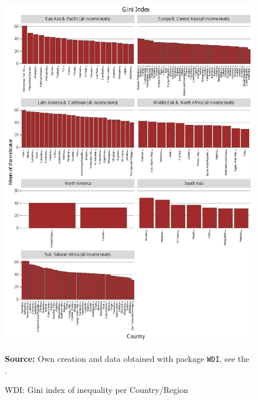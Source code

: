 \begin{figure}[H]
\begin{center}
\caption{WDI: Gini index of inequality per Country/Region}
\label{fig_wdi_gini}
\includegraphics[max height=.9\textheight]{../img/wdi_gini_index.pdf}
\end{center}
\noindent \footnotesize{\textbf{Source:} Own creation and data obtained with package \texttt{WDI}, see the \cite{wb_r}.}
\end{figure}


